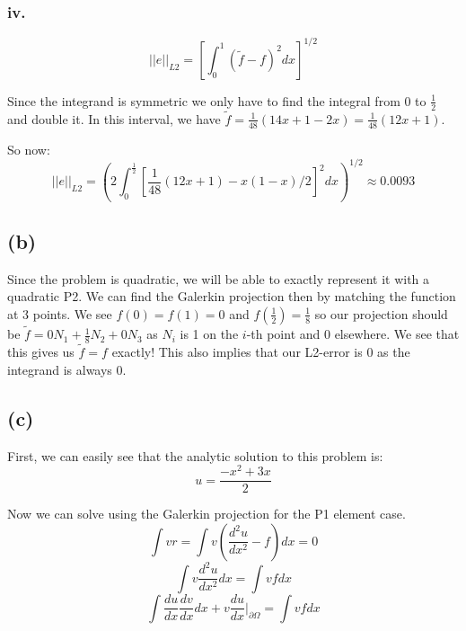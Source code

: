 \documentclass{article}
\begin{document}
\subsubsection*{iv.}
\begin{equation}
||e||_{L2}=\left[\int_0^1(\tilde f-f)^2dx\right]^{1/2}
\end{equation}

Since the integrand is symmetric we only have to find the integral from 0 to $\frac{1}{2}$ and double it. In this interval, we have $\tilde f=\frac{1}{48}(14x+1-2x)=\frac{1}{48}(12x+1)$.

So now:
\begin{equation}
||e||_{L2}=\left(2\int_0^{\frac{1}{2}}\left[\frac{1}{48}(12x+1)-x(1-x)/2\right]^2dx\right)^{1/2}\approx 0.0093
\end{equation}

\subsection*{(b)}
Since the problem is quadratic, we will be able to exactly represent it with a quadratic P2. We can find the Galerkin projection then by matching the function at 3 points. We see $f(0)=f(1)=0$ and $f(\frac{1}{2})=\frac{1}{8}$ so our projection should be $\tilde f=0N_1+\frac{1}{8}N_2+0N_3$ as $N_i$ is 1 on the $i$-th point and 0 elsewhere. We see that this gives us $\tilde f=f$ exactly! This also implies that our L2-error is 0 as the integrand is always 0.

\subsection*{(c)}
First, we can easily see that the analytic solution to this problem is:
\begin{equation}
u=\frac{-x^2+3x}{2}
\end{equation}

Now we can solve using the Galerkin projection for the P1 element case.
\begin{equation}
\int vr=\int v\left(\frac{d^2u}{dx^2}-f\right)dx=0
\end{equation}
\begin{equation}
\int v\frac{d^2u}{dx^2}dx = \int vfdx
\end{equation}
\begin{equation}
\int \frac{du}{dx}\frac{dv}{dx}dx+v\frac{du}{dx}|_{\partial\Omega}=\int vfdx
\end{equation}
\end{document}
